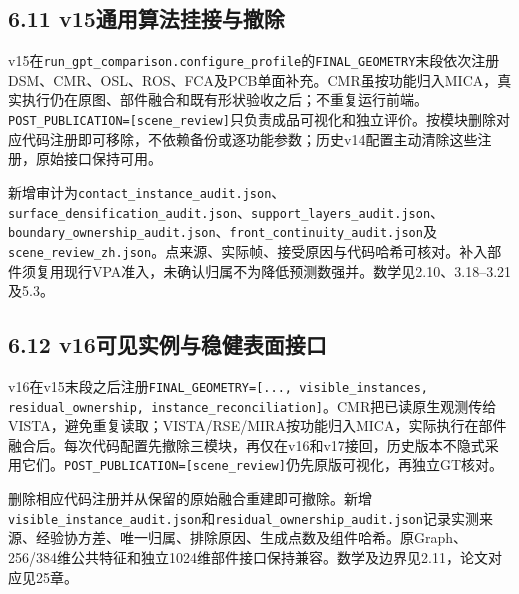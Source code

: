 \documentclass[UTF8,fontset=fandol]{ctexart}
\begin{document}
\subsection*{6.11 v15通用算法挂接与撤除}

v15在\texttt{run\_\allowbreak{}gpt\_\allowbreak{}comparison.\allowbreak{}configure\_\allowbreak{}profile}的\texttt{FINAL\_\allowbreak{}GEOMETRY}末段依次注册DSM、CMR、OSL、ROS、FCA及PCB单面补充。CMR虽按功能归入MICA，真实执行仍在原图、部件融合和既有形状验收之后；不重复运行前端。\texttt{POST\_\allowbreak{}PUBLICATION=[scene\_\allowbreak{}review]}只负责成品可视化和独立评价。按模块删除对应代码注册即可移除，不依赖备份或逐功能参数；历史v14配置主动清除这些注册，原始接口保持可用。



新增审计为\texttt{contact\_\allowbreak{}instance\_\allowbreak{}audit.\allowbreak{}json}、\texttt{surface\_\allowbreak{}densification\_\allowbreak{}audit.\allowbreak{}json}、\texttt{support\_\allowbreak{}layers\_\allowbreak{}audit.\allowbreak{}json}、\texttt{boundary\_\allowbreak{}ownership\_\allowbreak{}audit.\allowbreak{}json}、\texttt{front\_\allowbreak{}continuity\_\allowbreak{}audit.\allowbreak{}json}及\texttt{scene\_\allowbreak{}review\_\allowbreak{}zh.\allowbreak{}json}。点来源、实际帧、接受原因与代码哈希可核对。补入部件须复用现行VPA准入，未确认归属不为降低预测数强并。数学见2.10、3.18–3.21及5.3。



\subsection*{6.12 v16可见实例与稳健表面接口}

v16在v15末段之后注册\texttt{FINAL\_\allowbreak{}GEOMETRY=[.\allowbreak{}.\allowbreak{}.\allowbreak{}, visible\_\allowbreak{}instances, residual\_\allowbreak{}ownership, instance\_\allowbreak{}reconciliation]}。CMR把已读原生观测传给VISTA，避免重复读取；VISTA/RSE/MIRA按功能归入MICA，实际执行在部件融合后。每次代码配置先撤除三模块，再仅在v16和v17接回，历史版本不隐式采用它们。\texttt{POST\_\allowbreak{}PUBLICATION=[scene\_\allowbreak{}review]}仍先原版可视化，再独立GT核对。



删除相应代码注册并从保留的原始融合重建即可撤除。新增\texttt{visible\_\allowbreak{}instance\_\allowbreak{}audit.\allowbreak{}json}和\texttt{residual\_\allowbreak{}ownership\_\allowbreak{}audit.\allowbreak{}json}记录实测来源、经验协方差、唯一归属、排除原因、生成点数及组件哈希。原Graph、256/384维公共特征和独立1024维部件接口保持兼容。数学及边界见2.11，论文对应见25章。
\end{document}
